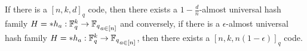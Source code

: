 \begin{theorem}
    If there is a \([n,k,d]_q\) code, then there exists a \(1- \frac{d}{n}\)-almost universal hash family \(H = \set{h_a : \mathbb{F}_q^k \to \mathbb{F}_q}_{a \in [n]}\) and conversely, if there is a \(\epsilon\)-almost universal hash family \(H = \set{h_a :  \mathbb{F}_q^k \to \mathbb{F}_q}_{a \in [n]}\), then there exists a \([n, k,n(1- \epsilon)]_q\) code.
\end{theorem}
